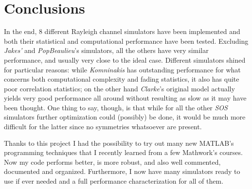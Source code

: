 \section{Conclusions} %
\label{sec:conclusions}

In the end, 8 different Rayleigh channel simulators have been implemented and both their statistical and computational performance have been tested. Excluding \textit{Jakes'} and \textit{PopBeaulieu}'s simulators, all the others have very similar performance, and usually very close to the ideal case. Different simulators shined for particular reasons: while \textit{Komninakis} has outstanding performance for what concerns both computational complexity and fading statistics, it also has quite poor correlation statistics; on the other hand \textit{Clarke}'s original model actually yields very good performance all around without resulting as slow as it may have been thought. One thing to say, though, is that while for all the other \textit{SOS} simulators further optimization could (possibly) be done, it would be much more difficult for the latter since no symmetries whatsoever are present.

Thanks to this project I had the possibility to try out many new MATLAB's programming techniques that I recently learned from a few Mathwork's courses. Now my code performs better, is more robust, and also well commented, documented and organized. Furthermore, I now have many simulators ready to use if ever needed and a full performance characterization for all of them.